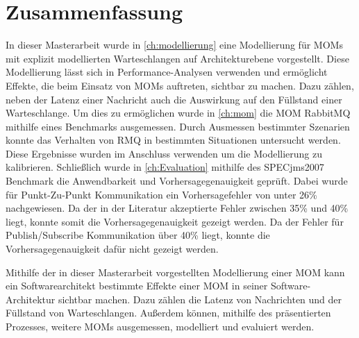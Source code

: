 
\chapter{Zusammenfassung}
\label{ch:zusammenfassung}
In dieser Masterarbeit wurde in \autoref{ch:modellierung} eine Modellierung für MOMs mit explizit modellierten Warteschlangen auf Architekturebene vorgestellt. Diese Modellierung lässt sich in Performance-Analysen verwenden und ermöglicht Effekte, die beim Einsatz von MOMs auftreten, sichtbar zu machen. Dazu zählen, neben der Latenz einer Nachricht auch die Auswirkung auf den Füllstand einer Warteschlange. Um dies zu ermöglichen wurde in \autoref{ch:mom} die MOM RabbitMQ mithilfe eines Benchmarks ausgemessen. Durch Ausmessen bestimmter Szenarien konnte das Verhalten von RMQ in bestimmten Situationen untersucht werden. Diese Ergebnisse wurden im Anschluss verwenden um die Modellierung zu kalibrieren. Schließlich wurde in \autoref{ch:Evaluation} mithilfe des SPECjms2007 Benchmark die Anwendbarkeit und Vorhersagegenauigkeit geprüft. Dabei wurde für Punkt-Zu-Punkt Kommunikation ein Vorhersagefehler von unter 26\% nachgewiesen. Da der in der Literatur akzeptierte Fehler zwischen 35\% und 40\% \cite{error} liegt, konnte somit die Vorhersagegenauigkeit gezeigt werden. Da der Fehler für Publish/Subscribe Kommunikation über 40\% liegt, konnte die Vorhersagegenauigkeit dafür nicht gezeigt werden.\par
Mithilfe der in dieser Masterarbeit vorgestellten Modellierung einer MOM kann ein Softwarearchitekt bestimmte Effekte einer MOM in seiner Software-Architektur sichtbar machen. Dazu zählen die Latenz von Nachrichten und der Füllstand von Warteschlangen. Außerdem können, mithilfe des präsentierten Prozesses, weitere MOMs ausgemessen, modelliert und evaluiert werden.  \par

